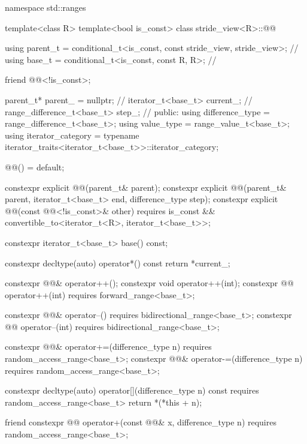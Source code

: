 \begin{codeblock}
namespace std::ranges {
  template<class R>
  template<bool is_const>
  class stride_view<R>::@@ {
    using parent_t = conditional_t<is_const, const stride_view, stride_view>; // \expos
    using base_t = conditional_t<is_const, const R, R>;                       // \expos

    friend @@<!is_const>;

    parent_t* parent_ = nullptr;        // \expos
    iterator_t<base_t> current_{};      // \expos
    range_difference_t<base_t> step_{}; // \expos
  public:
    using difference_type = range_difference_t<base_t>;
    using value_type = range_value_t<base_t>;
    using iterator_category = typename iterator_traits<iterator_t<base_t>>::iterator_category;

    @@() = default;

    constexpr explicit @@(parent_t& parent);
    constexpr explicit @@(parent_t& parent, iterator_t<base_t> end, difference_type step);
    constexpr explicit @@(const @@<!is_const>& other)
      requires is_const && convertible_to<iterator_t<R>, iterator_t<base_t>>;

    constexpr iterator_t<base_t> base() const;

    constexpr decltype(auto) operator*() const { return *current_; }

    constexpr @@& operator++();
    constexpr void operator++(int);
    constexpr @@ operator++(int) requires forward_range<base_t>;

    constexpr @@& operator--() requires bidirectional_range<base_t>;
    constexpr @@ operator--(int) requires bidirectional_range<base_t>;

    constexpr @@& operator+=(difference_type n) requires random_access_range<base_t>;
    constexpr @@& operator-=(difference_type n) requires random_access_range<base_t>;

    constexpr decltype(auto) operator[](difference_type n) const
      requires random_access_range<base_t>
    { return *(*this + n); }

    friend constexpr @@ operator+(const @@& x, difference_type n)
      requires random_access_range<base_t>;

}}
\end{codeblock}
